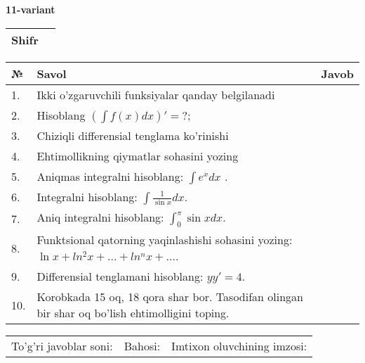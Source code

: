 \documentclass{article}
\begin{document}
  \egroup
  
  \newpage
  
  
  \textbf{11-variant}\\
  
  \bgroup
  \def\arraystretch{1.6} %
  
  \begin{tabular}{|m{5.7cm}|m{9.5cm}|}
  \hline
  Shifr & \\
  \hline
  \end{tabular}
  
  \vspace{1cm}
  
  \begin{tabular}{|m{0.7cm}|m{10cm}|m{4cm}|}
  \hline
  № & Savol & Javob \\
  \hline
  1. & Ikki o'zgaruvchili funksiyalar qanday belgilanadi &  \\
  \hline
  2. & Hisoblang \(\left( \int {f(x)dx} \right)' = ?\); &  \\
  \hline
  3. & Chiziqli differensial tenglama ko'rinishi &  \\
  \hline
  4. & Ehtimollikning qiymatlar sohasini yozing &  \\
  \hline
  5. & Aniqmas integralni hisoblang: \(\int {e^{x}dx}\) . &  \\
  \hline
  6. & Integralni hisoblang: \(\int {\frac{1}{\sin x}dx}\). &  \\
  \hline
  7. & Aniq integralni hisoblang: \(\int_{0}^{\pi}{\sin xdx}\). &  \\
  \hline
  8. & Funktsional qatorning yaqinlashishi sohasini yozing: \(\ln x + ln^{2}x + ... + ln^{n}x + ...\). &  \\
  \hline
  9. & Differensial tenglamani hisoblang: \(yy' = 4\). &  \\
  \hline
  10. & Korobkada 15 oq, 18 qora shar bor. Tasodifan olingan bir shar oq bo'lish ehtimolligini toping. &  \\
  \hline
  \end{tabular}
  
  \vspace{1cm}
  
  \begin{tabular}{lll}
  To'g'ri javoblar soni: \underline{\hspace{1.5cm}} & 
  Bahosi: \underline{\hspace{1.5cm}} & 
  Imtixon oluvchining imzosi: \underline{\hspace{2cm}} \\
  \end{tabular}
  
\end{document}
